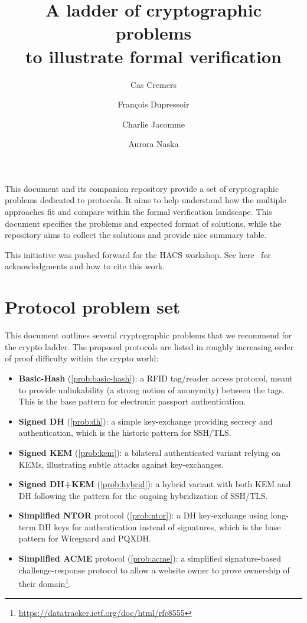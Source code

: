 \documentclass[11pt]{article}
\title{A ladder of cryptographic problems\\
to illustrate formal verification}
\author{Cas Cremers \and Fran\c{c}ois Dupressoir \and Charlie Jacomme \and Aurora Naska}
\begin{document}
\maketitle

This document and its companion repository\cite{ladder-repo} provide a set of cryptographic problems dedicated to protocols. It aims to help understand how the multiple approaches fit and compare within the formal verification landscape. This document specifies the problems and expected format of solutions, while the repository aims to collect the solutions and provide nice summary table.

This initiative was pushed forward for the HACS workshop. See here~\cite{ladder-repo-authors} for acknowledgments and how to cite this work.

\section{Protocol problem set}
This document outlines several cryptographic problems that we recommend for the crypto ladder.
The proposed protocols are listed in roughly increasing order of proof difficulty within the crypto world:
\begin{itemize}
\item \textbf{Basic-Hash} (\cref{prob:basic-hash}): a RFID tag/reader access protocol, meant to provide unlinkability (a strong notion of anonymity) between the tags. This is the base pattern for electronic passport authentication.
\item \textbf{Signed DH} (\cref{prob:dh}): a simple key-exchange providing secrecy and authentication, which is the historic pattern for SSH/TLS.
\item \textbf{Signed KEM} (\cref{prob:kem}): a bilateral authenticated variant relying on KEMs, illustrating subtle attacks against key-exchanges. 
\item  \textbf{Signed DH+KEM} (\cref{prob:hybrid}): a hybrid variant with both KEM and DH following the pattern for the ongoing hybridization of SSH/TLS.
\item \textbf{Simplified NTOR} protocol (\cref{prob:ntor}): a DH key-exchange using long-term DH keys for authentication instead of signatures, which is the base pattern for Wireguard and PQXDH.
\item \textbf{Simplified ACME} protocol (\cref{prob:acme}): a simplified signature-based challenge-response protocol to allow a website owner to prove ownership of their domain\footnote{\url{https://datatracker.ietf.org/doc/html/rfc8555}}.
\end{itemize}
\end{document}
